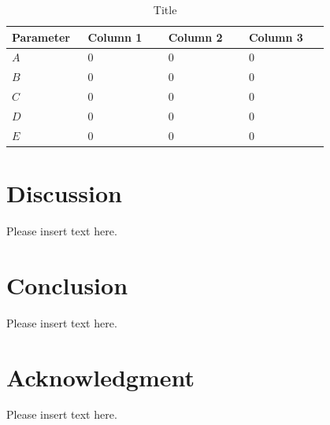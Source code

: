 \documentclass[journal,twocolumn,letterpaper]{IEEEJERM}
\begin{document}
\begin{table}[h]
\centering
\caption{Title}
\label{table} 
\begin{tabular}{|m{0.14\linewidth} | m{0.22\linewidth} | m{0.22\linewidth} | m{0.22\linewidth} |}
\hline
\textbf{Parameter} & \textbf{Column 1} & \textbf{Column 2} & \textbf{Column 3} \\
\hline
$A$ & 0 & 0 & 0\\ 
\hline
$B$ & 0 & 0 & 0\\
\hline
$C$ & 0 & 0 & 0\\
\hline
$D$ & 0 & 0 & 0\\ 
\hline
$E$ & 0 & 0 & 0\\
\hline

\end{tabular}
\end{table}



\section{Discussion} 

Please insert text here.


\section{Conclusion}
Please insert text here.

\vspace*{0.5 cm}

\section*{Acknowledgment}
Please insert text here.


%
%

\vspace*{ 1 cm}



% 
\end{document}
